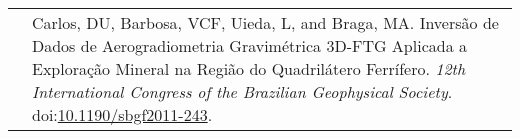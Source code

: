 \documentclass[11pt, a4paper]{article}
\newcommand{\TablePad}{\vspace{-0.4cm}}
\newcommand{\DOI}[1]{doi:\href{https://doi.org/#1}{#1}}
\newcommand{\Year}[1]{\fontsize{10pt}{0}\selectfont #1}
\begin{document}
\TablePad
\begin{tabularx}{\textwidth}{@{}l X}










\Year{2011}  &
    Carlos, DU, Barbosa, VCF, Uieda, L, and Braga, MA.
    Inversão de Dados de Aerogradiometria Gravimétrica 3D-FTG Aplicada a
    Exploração Mineral na Região do Quadrilátero Ferrífero.
    \emph{12th International Congress of the Brazilian Geophysical Society}.
    \DOI{10.1190/sbgf2011-243}.
\end{tabularx}
\end{document}
